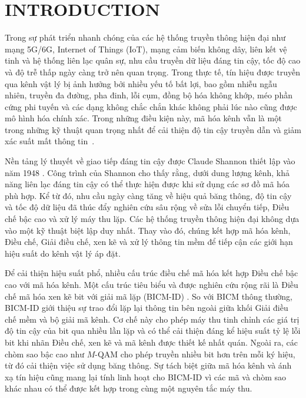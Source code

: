 \chapter*{INTRODUCTION}
Trong sự phát triển nhanh chóng của các hệ thống truyền thông hiện đại như mạng 5G/6G, Internet of Things (IoT), mạng cảm biến không dây, liên kết vệ tinh và hệ thống liên lạc quân sự, nhu cầu truyền dữ liệu đáng tin cậy, tốc độ cao và độ trễ thấp ngày càng trở nên quan trọng. Trong thực tế, tín hiệu được truyền qua kênh vật lý bị ảnh hưởng bởi nhiều yếu tố bất lợi, bao gồm nhiễu ngẫu nhiên, truyền đa đường, pha đinh, lỗi cụm, đồng bộ hóa không khớp, méo phần cứng phi tuyến và các dạng không chắc chắn khác không phải lúc nào cũng được mô hình hóa chính xác. Trong những điều kiện này, mã hóa kênh vẫn là một trong những kỹ thuật quan trọng nhất để cải thiện độ tin cậy truyền dẫn và giảm xác suất mất thông tin~.

Nền tảng lý thuyết về giao tiếp đáng tin cậy được Claude Shannon thiết lập vào năm 1948 \cite{shannon1948}. Công trình của Shannon cho thấy rằng, dưới dung lượng kênh, khả năng liên lạc đáng tin cậy có thể thực hiện được khi sử dụng các sơ đồ mã hóa phù hợp. Kể từ đó, nhu cầu ngày càng tăng về hiệu quả băng thông, độ tin cậy và tốc độ dữ liệu đã thúc đẩy nghiên cứu sâu rộng về sửa lỗi chuyển tiếp, Điều chế bậc cao và xử lý máy thu lặp. Các hệ thống truyền thông hiện đại không dựa vào một kỹ thuật biệt lập duy nhất. Thay vào đó, chúng kết hợp mã hóa kênh, Điều chế, Giải điều chế, xen kẽ và xử lý thông tin mềm để tiếp cận các giới hạn hiệu suất do kênh vật lý áp đặt.

Để cải thiện hiệu suất phổ, nhiều cấu trúc điều chế mã hóa kết hợp Điều chế bậc cao với mã hóa kênh. Một cấu trúc tiêu biểu và được nghiên cứu rộng rãi là Điều chế mã hóa xen kẽ bit với giải mã lặp (BICM-ID) \cite{caire1998,li1997,li1998}. So với BICM thông thường, BICM-ID giới thiệu sự trao đổi lặp lại thông tin bên ngoài giữa khối Giải điều chế mềm và bộ giải mã kênh. Cơ chế này cho phép máy thu tinh chỉnh các giá trị độ tin cậy của bit qua nhiều lần lặp và có thể cải thiện đáng kể hiệu suất tỷ lệ lỗi bit khi nhãn Điều chế, xen kẽ và mã kênh được thiết kế nhất quán. Ngoài ra, các chòm sao bậc cao như $M$-QAM cho phép truyền nhiều bit hơn trên mỗi ký hiệu, từ đó cải thiện việc sử dụng băng thông. Sự tách biệt giữa mã hóa kênh và ánh xạ tín hiệu cũng mang lại tính linh hoạt cho BICM-ID vì các mã và chòm sao khác nhau có thể được kết hợp trong cùng một nguyên tắc máy thu.

